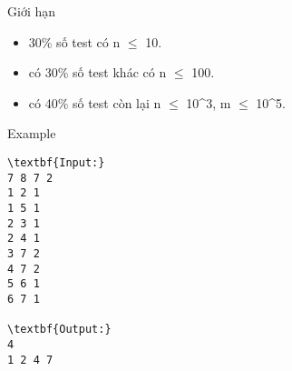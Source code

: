 Giới hạn
\begin{itemize}
	\item 30\% số test có n  $\le$  10.
	\item có 30\% số test khác có n  $\le$  100.
	\item có 40\% số test còn lại n  $\le$  10^3, m  $\le$  10^5.
\end{itemize}
Example
\begin{verbatim}
\textbf{Input:}
7 8 7 2
1 2 1
1 5 1
2 3 1
2 4 1
3 7 2
4 7 2
5 6 1
6 7 1

\textbf{Output:}
4
1 2 4 7
\end{verbatim}